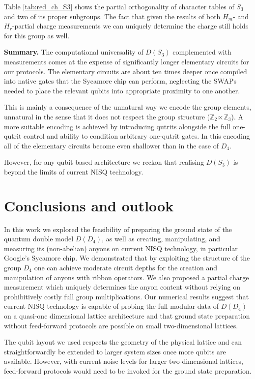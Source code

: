 \documentclass[a4paper,twocolumn,11pt]{quantumarticle}
\begin{document}
Table \ref{tab:red_ch_S3} shows the partial orthogonality of character tables of $S_3$ and two of its proper subgroups. The fact that given the results of both $H_m$- and $H_r$-partial charge measurements we can uniquely determine the charge still holds for this group as well. 

\textbf{Summary.}
The computational universality of $D(S_3)$ complemented with measurements comes at the expense of significantly longer elementary circuits for our protocols. The elementary circuits are about ten times deeper once compiled into native gates that the Sycamore chip can perform, neglecting the SWAPs needed to place the relevant qubits into appropriate proximity to one another.

This is mainly a consequence of the unnatural way we encode the group elements, unnatural in the sense that it does not respect the group structure ($\mathbb{Z}_2 \ltimes \mathbb{Z}_3$). A more suitable encoding is achieved by introducing qutrits alongside the full one-qutrit control and ability to condition arbitrary one-qutrit gates. In this encoding all of the elementary circuits become even shallower than in the case of $D_4$. 

However, for any qubit based architecture we reckon that realising $D(S_3)$ is beyond the limits of current NISQ technology.


\section{Conclusions and outlook} \label{sec:outlook}
In this work we explored the feasibility of preparing the ground state of the quantum double model $D(D_4)$, as well as creating, manipulating, and measuring its (non-abelian) anyons on current NISQ technology, in particular Google's Sycamore chip. We demonstrated that by exploiting the structure of the group $D_4$ one can achieve moderate circuit depths for the creation and manipulation of anyons with ribbon operators. We also proposed a partial charge measurement which uniquely determines the anyon content without relying on prohibitively costly full group multiplications. Our numerical results suggest that current NISQ technology is capable of probing the full modular data of $D(D_4)$ on a quasi-one dimensional lattice architecture and that ground state preparation without feed-forward protocols are possible on small two-dimensional lattices. 


The qubit layout we used respects the geometry of the physical lattice and can straightforwardly be extended to larger system sizes once more qubits are available. However, with current noise levels for larger two-dimensional lattices, feed-forward protocols would need to be invoked for the ground state preparation. 
\end{document}
